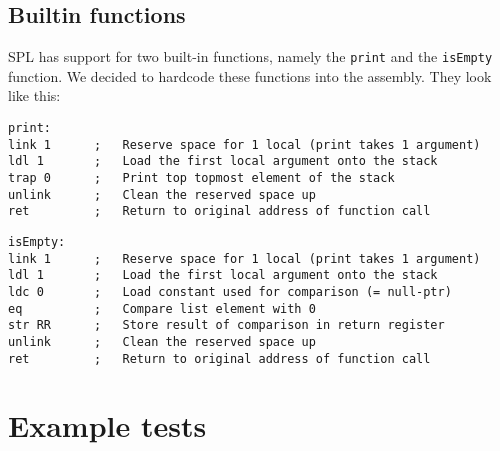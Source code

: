 \documentclass[a4paper]{article}
\begin{document}
\subsection{Builtin functions}
SPL has support for two built-in functions, namely the {\tt print} and the {\tt isEmpty} function. We decided to hardcode these functions into the assembly. They look like this:

\begin{lstlisting}
print:
link 1		;	Reserve space for 1 local (print takes 1 argument)
ldl 1		;	Load the first local argument onto the stack
trap 0		;	Print top topmost element of the stack
unlink		;	Clean the reserved space up
ret			;	Return to original address of function call
\end{lstlisting}
\begin{lstlisting}
isEmpty:
link 1		;	Reserve space for 1 local (print takes 1 argument)
ldl 1		;	Load the first local argument onto the stack
ldc 0		;	Load constant used for comparison (= null-ptr)
eq			;	Compare list element with 0
str RR		;	Store result of comparison in return register
unlink		;	Clean the reserved space up
ret			;	Return to original address of function call
\end{lstlisting}

\newpage 
\section{Example tests}
\label{examples}
\end{document}
